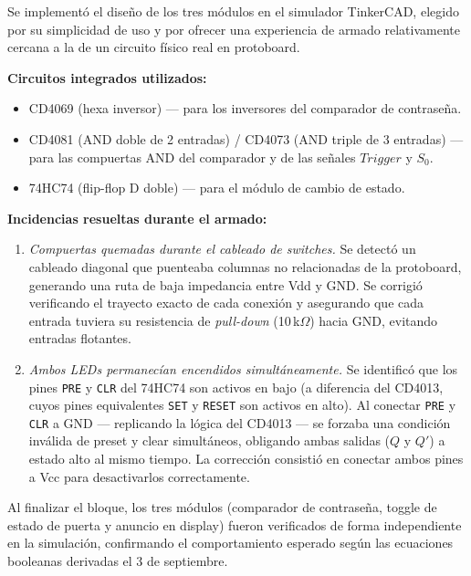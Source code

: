 \documentclass[11pt]{article}
\begin{document}
Se implementó el diseño de los tres módulos en el simulador TinkerCAD,
elegido por su simplicidad de uso y por ofrecer una experiencia de armado
relativamente cercana a la de un circuito físico real en protoboard.

\textbf{Circuitos integrados utilizados:}
\begin{itemize}[nosep]
    \item CD4069 (hexa inversor) --- para los inversores del comparador de
    contraseña.
    \item CD4081 (AND doble de 2 entradas) / CD4073 (AND triple de 3
    entradas) --- para las compuertas AND del comparador y de las señales
    $Trigger$ y $S_0$.
    \item 74HC74 (flip-flop D doble) --- para el módulo de cambio de
    estado.
\end{itemize}

\textbf{Incidencias resueltas durante el armado:}

\begin{enumerate}
    \item \emph{Compuertas quemadas durante el cableado de switches.} Se
    detectó un cableado diagonal que puenteaba columnas no relacionadas de
    la protoboard, generando una ruta de baja impedancia entre Vdd y GND.
    Se corrigió verificando el trayecto exacto de cada conexión y
    asegurando que cada entrada tuviera su resistencia de \emph{pull-down}
    (10\,k$\Omega$) hacia GND, evitando entradas flotantes.

    \item \emph{Ambos LEDs permanecían encendidos simultáneamente.} Se
    identificó que los pines \texttt{PRE} y \texttt{CLR} del 74HC74 son
    activos en bajo (a diferencia del CD4013, cuyos pines equivalentes
    \texttt{SET} y \texttt{RESET} son activos en alto). Al conectar
    \texttt{PRE} y \texttt{CLR} a GND --- replicando la lógica del CD4013
    --- se forzaba una condición inválida de preset y clear simultáneos,
    obligando ambas salidas ($Q$ y $Q'$) a estado alto al mismo tiempo. La
    corrección consistió en conectar ambos pines a Vcc para desactivarlos
    correctamente.
\end{enumerate}

Al finalizar el bloque, los tres módulos (comparador de contraseña,
toggle de estado de puerta y anuncio en display) fueron verificados de
forma independiente en la simulación, confirmando el comportamiento
esperado según las ecuaciones booleanas derivadas el 3 de septiembre.
\end{document}
